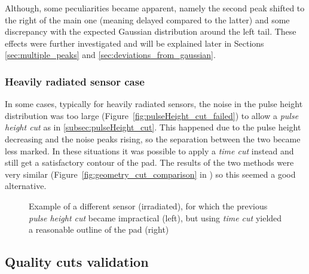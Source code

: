 Although, some peculiarities became apparent, namely the second peak shifted to the right of the main one (meaning delayed compared to the latter) and some discrepancy with the expected Gaussian distribution around the left tail. These effects were further investigated and will be explained later in Sections \ref{sec:multiple_peaks} and \ref{sec:deviations_from_gaussian}.

\subsubsection{Heavily radiated sensor case}\label{subsec:geometry_cut_w/pulse_cut}

In some cases, typically for heavily radiated sensors, the noise in the pulse height distribution was too large (Figure~\ref{fig:pulseHeight_cut_failed}) to allow a \textit{pulse height cut} as in \ref{subsec:pulseHeight_cut}. This happened due to the pulse height decreasing and the noise peaks rising, so the separation between the two became less marked. In these situations it was possible to apply a \textit{time cut} instead and still get a satisfactory contour of the pad. The results of the two methods were very similar (Figure~\ref{fig:geometry_cut_comparison} in ) so this seemed a good alternative.

\begin{figure}[h!tbp]
    \centering
    \hfill
    \centering
    \captionsetup{width=\captionwidth}
    \caption{Example of a different sensor (irradiated), for which the previous \textit{pulse height cut} became impractical (left), but using \textit{time cut} yielded a reasonable outline of the pad (right)}
\end{figure}

\subsection{Quality cuts validation}

